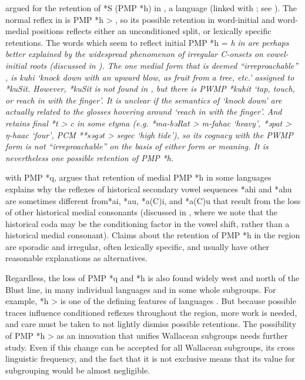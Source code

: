 \citet{Blust1981} argued for the retention of  *S (PMP
*h) in , a  language (linked with ; see ).
The normal reflex in  is PMP *h > {\0},
so its possible retention in word-initial
and word-medial positions reflects either an unconditioned split,
or lexically specific retentions.
The words which seem to reflect initial PMP *h = \it{h} in 
are perhaps better explained by the widespread phenomenon of
irregular C-onsets on vowel-initial roots (discussed in ).
The one medial form that is deemed “irreproachable” \citep[25]{Blust1981},
is  \it{kuhi} ‘knock down with an upward blow,
as fruit from a tree,
etc.’ assigned to  *kuSit.
However,  *kuSit is not found in \citet{BlustTrussel2020},
but there is PWMP *kuhit ‘tap,
touch, or reach in with the finger’.
It is unclear if the  semantics of ‘knock down’ are actually
related to the glosses hovering around ‘reach in with the finger’.
And  retains final *t > \it{c} in some etyma (e.g.
*ma-bəRat > \it{m-fahac} ‘heavy’,
*əpat > \it{ŋ-haac} ‘four’,
PCM **səgət \it{> segec} ‘high tide’),
so its cognacy with the PWMP form is not “irreproachable” on
the basis of either form or meaning.
It is nevertheless one possible retention of PMP *h.

 with PMP *q,
\citet[41ff]{Collins1983} argues that retention of medial PMP
*h in some  languages explains why the reflexes
of historical secondary vowel sequences *ahi
and *ahu are sometimes different from*ai,
*au, *a(C)i, and *a(C)u that result from the loss of other historical
medial consonants (discussed in ,
where we note that the historical coda may be the conditioning
factor in the vowel shift,
rather than a historical medial consonant).
Claims about the retention of PMP *h in the region are sporadic
and irregular, often lexically specific, and usually have other
reasonable explanations as alternatives.

Regardless, the loss of PMP *q
and *h is also found widely west
and north of the Blust line,
in many individual languages
and in some whole subgroups.
For example, *h > {\0} is one of the defining features of 
languages \citep{Mead2003a}.
But because possible traces influence conditioned reflexes throughout
the region, more work is needed,
and care must be taken to not lightly dismiss possible retentions.
The possibility of PMP *h > {\0} as an innovation that unifies
Wallacean subgroups needs further study.
Even if this change can be accepted for all Wallacean subgroups,
its cross linguistic frequency,
and the fact that it is not exclusive means that its value for
subgrouping would be almost negligible.

